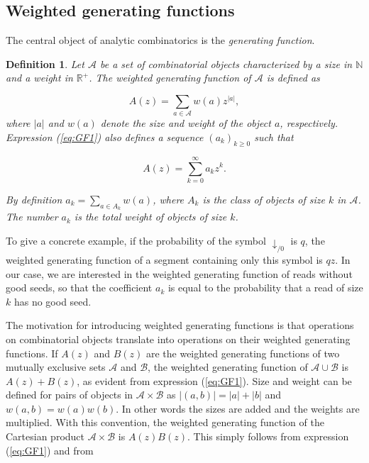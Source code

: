 \documentclass{article}
\newtheorem{definition}{Definition}
\begin{document}
\subsection{Weighted generating functions}

The central object of analytic combinatorics is the \emph{generating
function}.

\begin{definition}
\label{def:GF}
Let $\mathcal{A}$ be a set of combinatorial objects characterized by a
size in $\mathbb{N}$ and a weight in $\mathbb{R}^+$. The weighted
generating function of $\mathcal{A}$ is defined as

\begin{equation}
\label{eq:GF1}
A(z) = \sum_{a \in \mathcal{A}} w(a) z^{|a|},
\end{equation}
where $|a|$ and $w(a)$ denote the size and weight of the object $a$,
respectively. Expression (\ref{eq:GF1}) also defines a sequence $(a_k)_{k
\geq 0}$ such that 

\begin{equation*}
A(z) = \sum_{k=0}^\infty a_k z^k.
\end{equation*}

By definition $a_k = \sum_{a \in A_k}w(a)$, where $A_k$ is the class of
objects of size $k$ in $\mathcal{A}$. The number $a_k$ is the
total weight of objects of size $k$.
\end{definition}

To give a concrete example, if the probability of the symbol
$\downarrow_{/0}$ is $q$, the weighted generating function of a segment
containing only this symbol is $qz$. In our case, we are interested in the
weighted generating function of reads without good seeds, so that the
coefficient $a_k$ is equal to the probability that a read of size $k$ has
no good seed.

The motivation for introducing weighted generating functions is that
operations on combinatorial objects translate into operations on their
weighted generating functions. If $A(z)$ and $B(z)$ are the weighted
generating functions of two mutually exclusive sets $\mathcal{A}$ and
$\mathcal{B}$, the weighted generating function of $\mathcal{A} \cup
\mathcal{B}$ is $A(z) + B(z)$, as evident from expression (\ref{eq:GF1}).
Size and weight can be defined for pairs of objects in $\mathcal{A} \times
\mathcal{B}$ as $|(a,b)| = |a| + |b|$ and $w(a,b) = w(a)w(b)$. In other
words the sizes are added and the weights are multiplied.  With this
convention, the weighted generating function of the Cartesian product
$\mathcal{A} \times \mathcal{B}$ is $A(z)B(z)$. This simply follows from
expression (\ref{eq:GF1}) and from
\end{document}
